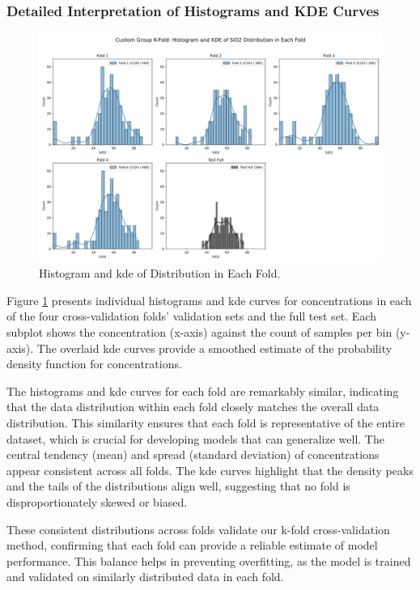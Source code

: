 \subsubsection{Detailed Interpretation of Histograms and KDE Curves}

\begin{figure}[h!]
    \centering
    \includegraphics[width=\textwidth]{images/histogram_grid_plot.png}
    \caption{Histogram and \gls{kde} of  Distribution in Each Fold.}
    \label{fig:histogram_grid_plot}
\end{figure}

Figure \ref{fig:histogram_grid_plot} presents individual histograms and \gls{kde} curves for  concentrations in each of the four cross-validation folds' validation sets and the full test set.
Each subplot shows the  concentration (x-axis) against the count of samples per bin (y-axis).
The overlaid \gls{kde} curves provide a smoothed estimate of the probability density function for  concentrations.

The histograms and \gls{kde} curves for each fold are remarkably similar, indicating that the data distribution within each fold closely matches the overall data distribution.
This similarity ensures that each fold is representative of the entire dataset, which is crucial for developing models that can generalize well.
The central tendency (mean) and spread (standard deviation) of  concentrations appear consistent across all folds.
The \gls{kde} curves highlight that the density peaks and the tails of the distributions align well, suggesting that no fold is disproportionately skewed or biased.

These consistent distributions across folds validate our k-fold cross-validation method, confirming that each fold can provide a reliable estimate of model performance.
This balance helps in preventing overfitting, as the model is trained and validated on similarly distributed data in each fold.


